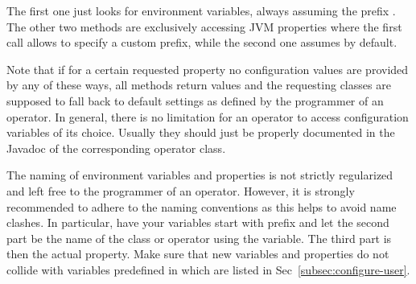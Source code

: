 \vspace*{-0.25cm}
The first one just looks for environment variables, always assuming the prefix
. The other two methods are exclusively accessing JVM properties
where the first call allows to specify a custom prefix, while the second one
assumes  by default.
																										
Note that if for a certain requested property no configuration values are
provided by any of these ways, all methods return  values and the
requesting classes are supposed to fall back to default settings as
defined by the programmer of an operator. In general, there is no limitation for an operator to access
configuration variables of its choice. Usually they should just be properly
documented in the Javadoc of the corresponding operator class.

The naming of environment variables and properties is not strictly regularized
and left free to the programmer of an operator. However, it is strongly
recommended to adhere to the \alida naming conventions as this helps to avoid
name clashes. In particular, have your variables start with prefix
 and let the second part be the name of the class or operator
using the variable. The third part is then the actual property. Make sure that
new variables and properties do not collide with variables predefined in \alida
which are listed in Sec~\ref{subsec:configure-user}.


